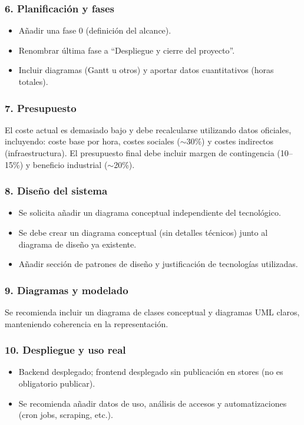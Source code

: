 \subsubsection*{6. Planificación y fases}
\begin{itemize}
    \item Añadir una fase 0 (definición del alcance).
    \item Renombrar última fase a ``Despliegue y cierre del proyecto''.
    \item Incluir diagramas (Gantt u otros) y aportar datos cuantitativos (horas totales).
\end{itemize}

\subsubsection*{7. Presupuesto}
El coste actual es demasiado bajo y debe recalcularse utilizando datos oficiales, incluyendo: coste base por hora, costes sociales ($\sim$30\%) y costes indirectos (infraestructura). El presupuesto final debe incluir margen de contingencia (10--15\%) y beneficio industrial ($\sim$20\%).

\subsubsection*{8. Diseño del sistema}
\begin{itemize}
    \item Se solicita añadir un diagrama conceptual independiente del tecnológico.
    \item Se debe crear un diagrama conceptual (sin detalles técnicos) junto al diagrama de diseño ya existente.
    \item Añadir sección de patrones de diseño y justificación de tecnologías utilizadas.
\end{itemize}

\subsubsection*{9. Diagramas y modelado}
Se recomienda incluir un diagrama de clases conceptual y diagramas UML claros, manteniendo coherencia en la representación.

\subsubsection*{10. Despliegue y uso real}
\begin{itemize}
    \item Backend desplegado; frontend desplegado sin publicación en stores (no es obligatorio publicar).
    \item Se recomienda añadir datos de uso, análisis de accesos y automatizaciones (cron jobs, scraping, etc.).
\end{itemize}

